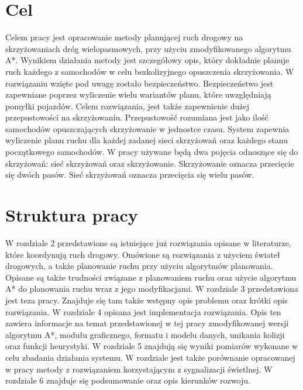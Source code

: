 \section{Cel}

Celem pracy jest opracowanie metody planującej ruch drogowy na skrzyżowaniach dróg wielopasmowych, przy użyciu zmodyfikowanego algorytmu A*. Wynikiem działania metody jest szczegółowy opis, który dokładnie planuje ruch każdego z samochodów w celu bezkolizyjnego opuszczenia skrzyżowania. W rozwiązaniu wzięte pod uwagę zostało bezpieczeństwo. Bezpieczeństwo jest zapewniane poprzez wyliczenie wielu wariantów planu, które uwzględniają pomyłki pojazdów. Celem rozwiązania, jest także zapewnienie dużej przepustowości na skrzyżowaniu. Przepustowość rozumiana jest jako ilość samochodów opuszczających skrzyżowanie w jednostce czasu. System zapewnia wyliczenie planu ruchu dla każdej zadanej sieci skrzyżowań oraz każdego stanu początkowego samochodów.
\newline
\indent
W pracy używane będą dwa pojęcia odnoszące się do skrzyżowań: sieć skrzyżowań oraz skrzyżowanie. Skrzyżowanie oznacza przecięcie się dwóch pasów. Sieć skrzyżowań oznacza przecięcia się wielu pasów.

\section{Struktura pracy}

W rozdziale 2 przedstawione są istniejące już rozwiązania opisane w literaturze, które koordynują ruch drogowy. Omówione są rozwiązania z użyciem świateł drogowych, a także planowanie ruchu przy użyciu algorytmów planowania. Opisane są także trudności związane z planowaniem ruchu oraz użycie algorytmu A* do planowania ruchu wraz z jego modyfikacjami.
\newline
\indent
W rozdziale 3 przedstawiona jest teza pracy. Znajduje się tam także wstępny opis problemu oraz krótki opis rozwiązania.
\newline
\indent
W rozdziale 4 opisana jest implementacja rozwiązania. Opis ten zawiera informacje na temat przedstawionej w tej pracy zmodyfikowanej wersji algorytmu A*, modułu graficznego, formatu i modelu danych, unikania kolizji oraz funkcji heurystyki.
\newline
\indent
W rozdziale 5 znajdują się wyniki pomiarów wykonane w celu zbadania działania systemu. W rozdziale jest także porównanie opracowanej w pracy metody z rozwiązaniem korzystającym z sygnalizacji świetlnej.
\newline
\indent
W rozdziale 6 znajduje się podsumowanie oraz opis kierunków rozwoju.
